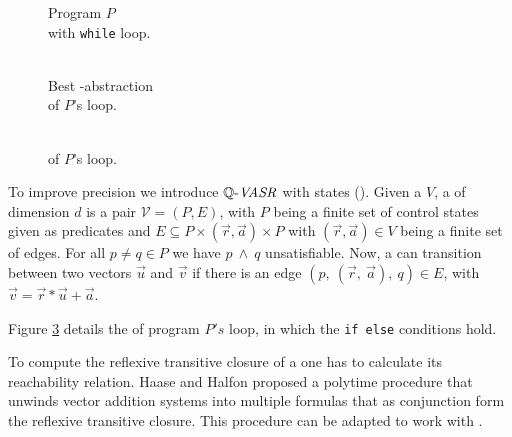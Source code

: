 \begin{minipage}[t]{0.3\linewidth} \centering
	\begin{figure}[H]
		
		\caption{Program $P$ \\ with \texttt{while} loop.}
		\label{code}
	\end{figure}
\end{minipage}
\begin{minipage}[t]{0.35\linewidth} \centering
	\begin{figure}[H]
			
			\caption{\\ Best \qvasr-abstraction \\ of $P$'s loop.}
			\label{vasr}
	\end{figure}
\end{minipage}
\begin{minipage}[t]{0.3\linewidth} \centering
	\begin{figure}[H]
		
		\caption{\\ \qvasrs of $P$'s loop.}
		\label{vasrs}
	\end{figure}
\end{minipage}
\vspace*{1cm}

To improve precision we introduce $\mathit{\mathbb{Q} \text{-}VASR}$ with states (\qvasrs). Given a \qvasr $V$, a \qvasrs of dimension $d$ is a pair $\mathcal{V} = (P, E)$, with $P$ being a finite set of control states given as predicates and $E \subseteq P \times (\vec{r}, \vec{a}) \times P$ with $(\vec{r}, \vec{a}) \in V$ being a finite set of edges. For all $p \neq q \in P$ we have $p\ \land\ q$ unsatisfiable. Now, a \qvasrs can transition between two vectors $\vec{u}$ and $\vec{v}$ if there is an edge $(p,\ (\vec{r},\ \vec{a}),\ q) \in E$, with $\vec{v} = \vec{r} * \vec{u} + \vec{a}$. \par
Figure \ref{vasrs} details the \qvasrs of program $P's$ loop, in which the \texttt{if else} conditions hold. \par
To compute the reflexive transitive closure of a \qvasrs one has to calculate its reachability relation. Haase and Halfon \cite{10.1007/978-3-319-11439-2_9} proposed a polytime procedure that unwinds vector addition systems into multiple formulas that as conjunction form the reflexive transitive closure. This procedure can be adapted to work with \qvasrs. \\ \par

